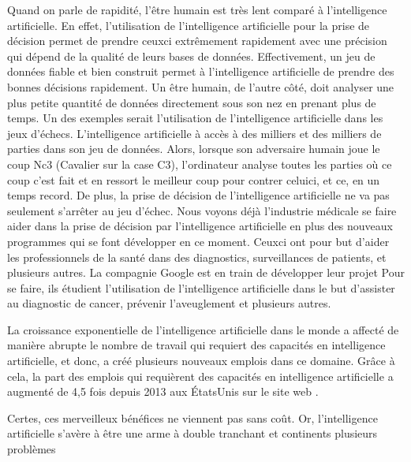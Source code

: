 \documentclass[letterpaper,10pt,french]{sphinxmanual}
\begin{document}
Quand on parle de rapidité, l’être humain est très lent comparé à l’intelligence
artificielle. En effet, l’utilisation de l’intelligence artificielle pour la prise
de décision permet de prendre ceux\sphinxhyphen{}ci extrêmement rapidement avec une précision qui
dépend de la qualité de leurs bases de données. Effectivement, un jeu de données fiable
et bien construit permet à l’intelligence artificielle de prendre des bonnes décisions
rapidement. Un être humain, de l’autre côté, doit analyser une plus petite quantité de
données directement sous son nez en prenant plus de temps. Un des exemples serait
l’utilisation de l’intelligence artificielle dans les jeux d’échecs. L’intelligence
artificielle à accès à des milliers et des milliers de parties dans son jeu de
données. Alors, lorsque son adversaire humain joue le coup  Nc3 (Cavalier sur la case C3),
l’ordinateur analyse toutes les parties où ce coup c’est fait et en ressort le meilleur
coup pour contrer celui\sphinxhyphen{}ci, et ce, en un temps record. De plus, la prise de décision de
l’intelligence artificielle ne va pas seulement s’arrêter au jeu d’échec. Nous voyons
déjà l’industrie médicale se faire aider dans la prise de décision par l’intelligence
artificielle en plus des nouveaux programmes qui se font développer en ce moment. Ceux\sphinxhyphen{}ci
ont pour but d’aider les professionnels de la santé dans des diagnostics, surveillances
de patients, et plusieurs autres. La compagnie Google est en train de développer  leur
projet  Pour se faire, ils étudient l’utilisation de l’intelligence artificielle
dans le but d’assister au diagnostic de cancer, prévenir l’aveuglement et plusieurs autres.

La croissance exponentielle de l’intelligence artificielle dans le monde a affecté
de manière abrupte le nombre de travail qui requiert des capacités en intelligence
artificielle, et donc, a créé plusieurs nouveaux emplois dans ce domaine. Grâce à cela,
la part des emplois qui requièrent des capacités en intelligence artificielle a augmenté
de 4,5 fois depuis 2013 aux États\sphinxhyphen{}Unis sur le site web .

Certes, ces merveilleux bénéfices ne viennent pas sans coût. Or, l’intelligence artificielle
s’avère à être une arme à double tranchant et continents plusieurs problèmes
\end{document}
